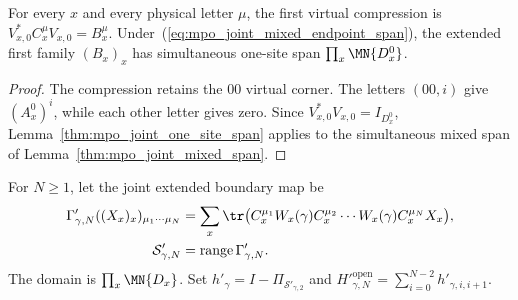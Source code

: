 \begin{lemma}
    \label{thm:mpo_joint_mixed_compression}
    \leanok
    For every $x$ and every physical letter $\mu$, the first virtual
    compression is $V_{x,0}^*C_x^\mu V_{x,0}=B_x^\mu$.
    Under~(\ref{eq:mpo_joint_mixed_endpoint_span}), the extended first
    family $(B_x)_x$ has simultaneous one-site span
    $\prod_x\MN{D_x^0}$.
\end{lemma}
\begin{proof}
    \leanok
    The compression retains the $00$ virtual corner. The letters
    $(00,i)$ give $(A_x^0)^i$, while each other letter gives zero.
    Since $V_{x,0}^*V_{x,0}=I_{D_x^0}$,
    Lemma~\ref{thm:mpo_joint_one_site_span} applies to the simultaneous
    mixed span of Lemma~\ref{thm:mpo_joint_mixed_span}.
\end{proof}

\begin{definition}
    \label{def:mpo_joint_mixed_support}
    For $N\geq1$, let the joint extended boundary map be
    \begin{align}
        \Gamma'_{\gamma,N}((X_x)_x)_{\mu_1\cdots\mu_N}
                               & =\sum_x\tr\bigl(
        C_x^{\mu_1}W_x(\gamma)C_x^{\mu_2}
        \cdots W_x(\gamma)C_x^{\mu_N}X_x\bigr),
        \label{eq:mpo_joint_mixed_boundary}                               \\
        \mathcal S'_{\gamma,N} & =\operatorname{range}\Gamma'_{\gamma,N}.
    \end{align}
    The domain is $\prod_x\MN{D_x}$. Set
    $h'_\gamma=I-\Pi_{\mathcal S'_{\gamma,2}}$ and
    $H'^{\mathrm{open}}_{\gamma,N}=\sum_{i=0}^{N-2}h'_{\gamma,i,i+1}$.
\end{definition}

